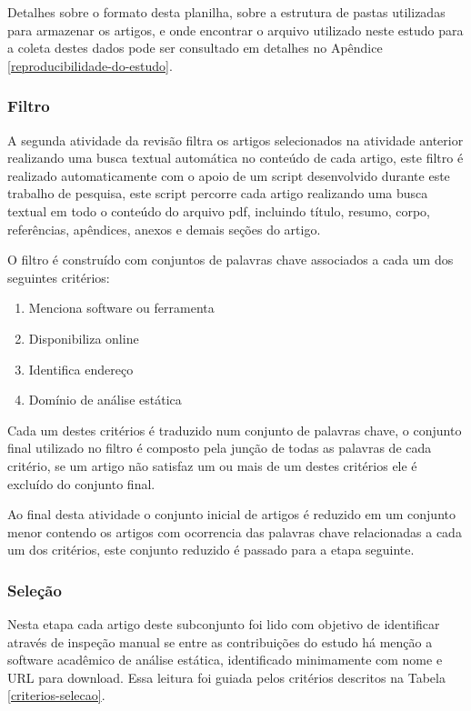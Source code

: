 Detalhes sobre o formato desta planilha, sobre a estrutura de pastas utilizadas
para armazenar os artigos, e onde encontrar o arquivo utilizado neste estudo
para a coleta destes dados pode ser consultado em detalhes no Apêndice
\ref{reproducibilidade-do-estudo}.

\subsubsection{Filtro}

A segunda atividade da revisão filtra os artigos selecionados na
atividade anterior realizando uma busca textual automática no conteúdo de cada
artigo, este filtro é realizado automaticamente com o apoio de um script
desenvolvido durante este trabalho de pesquisa, este script percorre cada
artigo realizando uma busca textual em todo o conteúdo do arquivo pdf,
incluindo título, resumo, corpo, referências, apêndices, anexos e demais seções
do artigo.

O filtro é construído com conjuntos de palavras chave associados a cada um dos
seguintes critérios:

\begin{enumerate}
  \item Menciona software ou ferramenta
  \item Disponibiliza online
  \item Identifica endereço
  \item Domínio de análise estática
\end{enumerate}

Cada um destes critérios é traduzido num conjunto de palavras chave, o conjunto
final utilizado no filtro é composto pela junção de todas as palavras de cada
critério, se um artigo não satisfaz um ou mais de um destes critérios ele é
excluído do conjunto final.

Ao final desta atividade o conjunto inicial de artigos é reduzido em um
conjunto menor contendo os artigos com ocorrencia das palavras chave
relacionadas a cada um dos critérios, este conjunto reduzido é passado para a
etapa seguinte.



\subsubsection{Seleção}

Nesta etapa cada artigo deste subconjunto foi lido com objetivo de identificar
através de inspeção manual se entre as contribuições do estudo há menção a
software acadêmico de análise estática, identificado minimamente com nome e URL
para download.
Essa leitura foi guiada pelos critérios descritos na Tabela \ref{criterios-selecao}.

